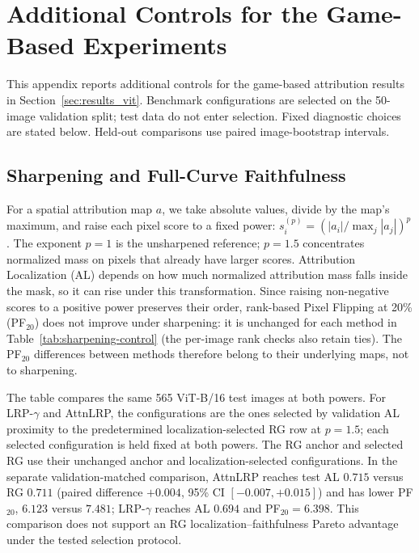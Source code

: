 \chapter{Additional Controls for the Game-Based Experiments}\label{app:rebuttal-controls}

This appendix reports additional controls for the game-based attribution results in Section~\ref{sec:results_vit}. Benchmark configurations are selected on the 50-image validation split; test data do not enter selection. Fixed diagnostic choices are stated below. Held-out comparisons use paired image-bootstrap intervals.

\section{Sharpening and Full-Curve Faithfulness}\label{app:rebuttal-sharpening}

For a spatial attribution map $a$, we take absolute values, divide by the map's maximum, and raise each pixel score to a fixed power: $s_i^{(p)}=(|a_i|/\max_j|a_j|)^p$. The exponent $p=1$ is the unsharpened reference; $p=1.5$ concentrates normalized mass on pixels that already have larger scores. Attribution Localization (AL) depends on how much normalized attribution mass falls inside the mask, so it can rise under this transformation. Since raising non-negative scores to a positive power preserves their order, rank-based Pixel Flipping at 20\% (PF$_{20}$) does not improve under sharpening: it is unchanged for each method in Table~\ref{tab:sharpening-control} (the per-image rank checks also retain ties). The PF$_{20}$ differences between methods therefore belong to their underlying maps, not to sharpening.

The table compares the same 565 ViT-B/16 test images at both powers. For LRP-$\gamma$ and AttnLRP, the configurations are the ones selected by validation AL proximity to the predetermined localization-selected RG row at $p=1.5$; each selected configuration is held fixed at both powers. The RG anchor and selected RG use their unchanged anchor and localization-selected configurations. In the separate validation-matched comparison, AttnLRP reaches test AL $0.715$ versus RG $0.711$ (paired difference $+0.004$, 95\% CI $[-0.007,+0.015]$) and has lower PF$_{20}$, $6.123$ versus $7.481$; LRP-$\gamma$ reaches AL $0.694$ and PF$_{20}=6.398$. This comparison does not support an RG localization--faithfulness Pareto advantage under the tested selection protocol.

